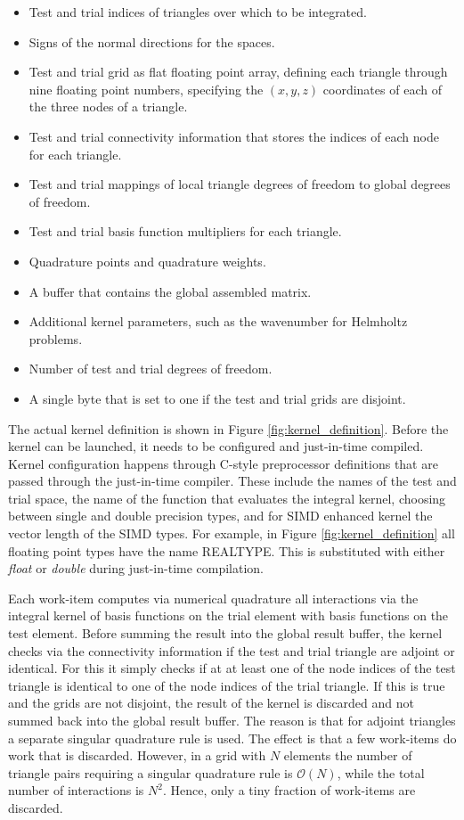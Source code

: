\begin{itemize}
	\item Test and trial indices of triangles over which to be integrated.
	\item Signs of the normal directions for the spaces.
	\item Test and trial grid as flat floating point array, defining each triangle through nine floating point numbers, specifying the $(x, y, z)$ coordinates of each of the three nodes of a triangle.
	\item Test and trial connectivity information that stores the indices of each node for each triangle.
	\item Test and trial mappings of local triangle degrees of freedom to global degrees of freedom.
	\item Test and trial basis function multipliers for each triangle.
	\item Quadrature points and quadrature weights.
	\item A buffer that contains the global assembled matrix.
	\item Additional kernel parameters, such as the wavenumber for Helmholtz problems.
	\item Number of test and trial degrees of freedom.
	\item A single byte that is set to one if the test and trial grids are disjoint.
\end{itemize}
The actual kernel definition is shown in Figure \ref{fig:kernel_definition}.
Before the kernel can be launched, it needs to be configured and just-in-time compiled. Kernel configuration happens through C-style preprocessor definitions that are passed through the just-in-time compiler. These include the names of the test and trial space, the name of the function that evaluates the integral kernel, choosing between single and double precision types, and for SIMD enhanced kernel the vector length of the SIMD types.
For example, in Figure \ref{fig:kernel_definition} all floating point types have the name REALTYPE. This is substituted with either \textit{float} or \textit{double} during just-in-time compilation.

Each work-item computes via numerical quadrature all interactions via the integral kernel of basis functions on the trial element with basis functions on the test element. Before summing the result into the global result buffer, the kernel checks via the connectivity information if the test and trial triangle are adjoint or identical. For this it simply checks if at at least one of the node indices of the test triangle is identical to one of the node indices of the trial triangle. If this is true and the grids are not disjoint, the result of the kernel is discarded and not summed back into the global result buffer. The reason is that for adjoint triangles a separate singular quadrature rule is used. The effect is that a few work-items do work that is discarded. However, in a grid with $N$ elements the number of triangle pairs requiring a singular quadrature rule is $\mathcal{O}(N)$, while the total number of interactions is $N^2$. Hence, only a tiny fraction of work-items are discarded.


